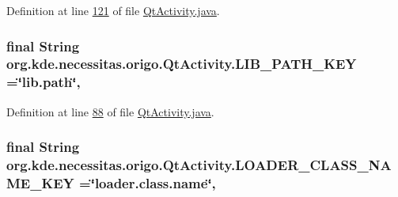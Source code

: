 Definition at line \hyperlink{_qt_activity_8java_source_l00121}{121} of file \hyperlink{_qt_activity_8java_source}{Qt\-Activity.\-java}.

\hypertarget{classorg_1_1kde_1_1necessitas_1_1origo_1_1_qt_activity_a3dfa8cb4dd668453d2b4a2a48fb580e5}{
\subsubsection[{L\-I\-B\-\_\-\-P\-A\-T\-H\-\_\-\-K\-E\-Y}]{\setlength{\rightskip}{0pt plus 5cm}final String org.\-kde.\-necessitas.\-origo.\-Qt\-Activity.\-L\-I\-B\-\_\-\-P\-A\-T\-H\-\_\-\-K\-E\-Y =\char`\"{}lib.\-path\char`\"{}\hspace{0.3cm}{\ttfamily [static]}, {\ttfamily [private]}}}\label{db/d37/classorg_1_1kde_1_1necessitas_1_1origo_1_1_qt_activity_a3dfa8cb4dd668453d2b4a2a48fb580e5}


Definition at line \hyperlink{_qt_activity_8java_source_l00088}{88} of file \hyperlink{_qt_activity_8java_source}{Qt\-Activity.\-java}.

\hypertarget{classorg_1_1kde_1_1necessitas_1_1origo_1_1_qt_activity_ac7e045c85bcac829258169df8ae96ecb}{
\subsubsection[{L\-O\-A\-D\-E\-R\-\_\-\-C\-L\-A\-S\-S\-\_\-\-N\-A\-M\-E\-\_\-\-K\-E\-Y}]{\setlength{\rightskip}{0pt plus 5cm}final String org.\-kde.\-necessitas.\-origo.\-Qt\-Activity.\-L\-O\-A\-D\-E\-R\-\_\-\-C\-L\-A\-S\-S\-\_\-\-N\-A\-M\-E\-\_\-\-K\-E\-Y =\char`\"{}loader.\-class.\-name\char`\"{}\hspace{0.3cm}{\ttfamily [static]}, {\ttfamily [private]}}}\label{db/d37/classorg_1_1kde_1_1necessitas_1_1origo_1_1_qt_activity_ac7e045c85bcac829258169df8ae96ecb}


